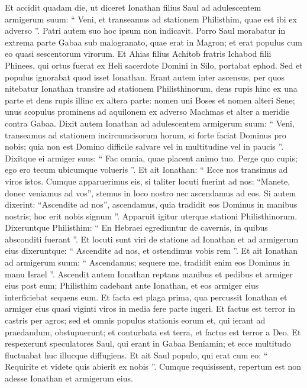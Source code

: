 \begin{biblechapter}
\begin{biblechapter}
\begin{biblechapter}
\begin{biblechapter}
\begin{biblechapter}
\begin{biblechapter}
\begin{biblechapter}
\begin{biblechapter}
\begin{biblechapter}
\begin{biblechapter}
\begin{biblechapter}
\begin{biblechapter}
\begin{biblechapter}
\begin{biblechapter}
\verse Et accidit quadam die, ut diceret Ionathan filius Saul ad adulescentem armigerum suum: “ Veni, et transeamus ad stationem Philisthim, quae est ibi ex adverso ”. Patri autem suo hoc ipsum non indicavit. 
\verse Porro Saul morabatur in extrema parte Gabaa sub malogranato, quae erat in Magron; et erat populus cum eo quasi sescentorum virorum. 
\verse Et Ahias filius Achitob fratris Ichabod filii Phinees, qui ortus fuerat ex Heli sacerdote Domini in Silo, portabat ephod. Sed et populus ignorabat quod isset Ionathan.
 \verse Erant autem inter ascensus, per quos nitebatur Ionathan transire ad stationem Philisthinorum, dens rupis hinc ex una parte et dens rupis illinc ex altera parte: nomen uni Boses et nomen alteri Sene; 
\verse unus scopulus prominens ad aquilonem ex adverso Machmas et alter a meridie contra Gabaa. 
\verse Dixit autem Ionathan ad adulescentem armigerum suum: “ Veni, transeamus ad stationem incircumcisorum horum, si forte faciat Dominus pro nobis; quia non est Domino difficile salvare vel in multitudine vel in paucis ”. 
\verse Dixitque ei armiger suus: “ Fac omnia, quae placent animo tuo. Perge quo cupis; ego ero tecum ubicumque volueris ”. 
\verse Et ait Ionathan: “ Ecce nos transimus ad viros istos. Cumque apparuerimus eis, 
\verse si taliter locuti fuerint ad nos: “Manete, donec veniamus ad vos”, stemus in loco nostro nec ascendamus ad eos. 
\verse Si autem dixerint: “Ascendite ad nos”, ascendamus, quia tradidit eos Dominus in manibus nostris; hoc erit nobis signum ”.
 \verse Apparuit igitur uterque stationi Philisthinorum. Dixeruntque Philisthim: “ En Hebraei egrediuntur de cavernis, in quibus absconditi fuerant ”. 
\verse Et locuti sunt viri de statione ad Ionathan et ad armigerum eius dixeruntque: “ Ascendite ad nos, et ostendimus vobis rem ”. Et ait Ionathan ad armigerum suum: “ Ascendamus; sequere me, tradidit enim eos Dominus in manu Israel ”. 
\verse Ascendit autem Ionathan reptans manibus et pedibus et armiger eius post eum; Philisthim cadebant ante Ionathan, et eos armiger eius interficiebat sequens eum. 
\verse Et facta est plaga prima, qua percussit Ionathan et armiger eius quasi viginti viros in media fere parte iugeri. 
\verse Et factus est terror in castris per agros; sed et omnis populus stationis eorum et, qui ierant ad praedandum, obstupuerunt; et conturbata est terra, et factus est terror a Deo.
 \verse Et respexerunt speculatores Saul, qui erant in Gabaa Beniamin; et ecce multitudo fluctuabat huc illucque diffugiens. 
\verse Et ait Saul populo, qui erat cum eo: “ Requirite et videte quis abierit ex nobis ”. Cumque requisissent, repertum est non adesse Ionathan et armigerum eius. 

\end{biblechapter}
\end{biblechapter}
\end{biblechapter}
\end{biblechapter}
\end{biblechapter}
\end{biblechapter}
\end{biblechapter}
\end{biblechapter}
\end{biblechapter}
\end{biblechapter}
\end{biblechapter}
\end{biblechapter}
\end{biblechapter}
\end{biblechapter}

